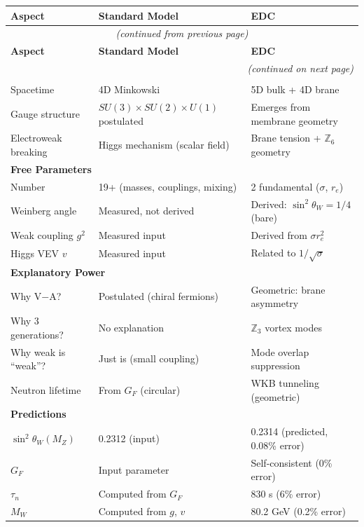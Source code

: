 \documentclass[11pt,a4paper]{book}
\theoremstyle{definition}
\theoremstyle{remark}
\begin{document}
\begin{center}
\begin{longtable}{p{4cm}p{5cm}p{5cm}}
\toprule
\textbf{Aspect} & \textbf{Standard Model} & \textbf{EDC} \\
\midrule
\endfirsthead
\multicolumn{3}{c}{{\textit{(continued from previous page)}}} \\
\toprule
\textbf{Aspect} & \textbf{Standard Model} & \textbf{EDC} \\
\midrule
\endhead
\midrule
\multicolumn{3}{r}{{\textit{(continued on next page)}}} \\
\endfoot
\bottomrule
\endlastfoot

\multicolumn{3}{l}{\textbf{Foundational Assumptions}} \\
\midrule
Spacetime & 4D Minkowski & 5D bulk + 4D brane \\
Gauge structure & $SU(3) \times SU(2) \times U(1)$ postulated & Emerges from membrane geometry \\
Electroweak breaking & Higgs mechanism (scalar field) & Brane tension + $\mathbb{Z}_6$ geometry \\
\midrule

\multicolumn{3}{l}{\textbf{Free Parameters}} \\
\midrule
Number & 19+ (masses, couplings, mixing) & 2 fundamental ($\sigma$, $r_e$) \\
Weinberg angle & Measured, not derived & Derived: $\sin^2\theta_W = 1/4$ (bare) \\
Weak coupling $g^2$ & Measured input & Derived from $\sigma r_e^2$ \\
Higgs VEV $v$ & Measured input & Related to $1/\sqrt{\sigma}$ \\
\midrule

\multicolumn{3}{l}{\textbf{Explanatory Power}} \\
\midrule
Why V$-$A? & Postulated (chiral fermions) & Geometric: brane asymmetry \\
Why 3 generations? & No explanation & $\mathbb{Z}_3$ vortex modes \\
Why weak is ``weak''? & Just is (small coupling) & Mode overlap suppression \\
Neutron lifetime & From $G_F$ (circular) & WKB tunneling (geometric) \\
\midrule

\multicolumn{3}{l}{\textbf{Predictions}} \\
\midrule
$\sin^2\theta_W(M_Z)$ & 0.2312 (input) & 0.2314 (predicted, 0.08\% error) \\
$G_F$ & Input parameter & Self-consistent (0\% error) \\
$\tau_n$ & Computed from $G_F$ & 830 s (6\% error) \\
$M_W$ & Computed from $g$, $v$ & 80.2 GeV (0.2\% error) \\
\midrule


\end{longtable}
\end{center}
\end{document}
